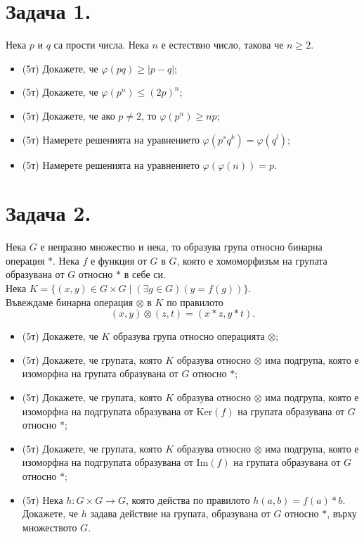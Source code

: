 \documentclass[17pt]{extarticle}
\begin{document}
\section*{Задача 1.}
Нека \(p\) и \(q\) са прости числа. Нека \(n\) е естествно число, такова че \(n \geq 2\).


\begin{itemize}
    \item (5т) Докажете, че \(\varphi(pq) \geq |p - q|\);
    \item (5т) Докажете, че \(\varphi(p^n) \leq (2p)^n\);
    \item (5т) Докажете, че ако \(p \neq 2\), то \(\varphi(p^n) \geq np\);
    \item (5т) Намерете решенията на уравнението \(\varphi(p^s q^k) = \varphi(q^l)\);
    \item (5т) Намерете решенията на уравнението \(\varphi(\varphi(n)) = p\).
\end{itemize}

\newpage

\section*{Задача 2.}
Нека \(G\) е непразно множество и нека, то образува група относно бинарна операция \(*\).
Нека \(f\) е функция от \(G\) в \(G\), която е хомоморфизъм на групата образувана от \(G\) относно \(*\) в себе си. \\
Нека \(K = \{(x, y) \in G \times G \mid (\exists g \in G)(y = f(g))\}\). \\
Въвеждаме бинарна операция \(\otimes\) в \(K\) по правилото
\[ (x, y) \otimes (z, t) = (x * z, y * t).  \]

\begin{itemize}
    \item (5т) Докажете, че \(K\) образува група относно операцията \(\otimes\);
    \item (5т) Докажете, че групата, която \(K\) образува относно \(\otimes\) има подгрупа, която е изоморфна на групата образувана от \(G\) относно \(*\);
    \item (5т) Докажете, че групата, която \(K\) образува относно \(\otimes\) има подгрупа, която е изоморфна на подгрупата образувана от \(\mathrm{Ker}(f)\) на групата образувана от \(G\) относно \(*\);
    \item (5т) Докажете, че групата, която \(K\) образува относно \(\otimes\) има подгрупа, която е изоморфна на подгрупата образувана от \(\mathrm{Im}(f)\) на групата образувана от \(G\) относно \(*\);
    \item (5т) Нека \(h : G \times G \to G\), която действа по правилото \(h(a, b) = f(a) * b\). Докажете, че \(h\) задава действие на групата, образувана от \(G\) относно \(*\), върху множеството \(G\).
\end{itemize}
\end{document}
